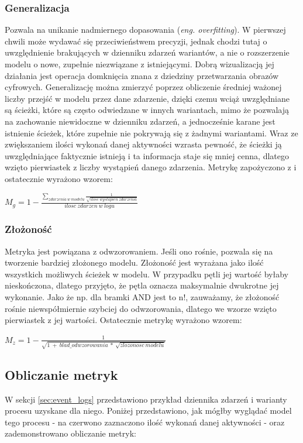 \subsubsection{Generalizacja}
Pozwala na unikanie nadmiernego dopasowania (\textit{eng. overfitting}). W pierwszej chwili może wydawać się przeciwieństwem precyzji, jednak chodzi tutaj o uwzględnienie brakujących w dzienniku zdarzeń wariantów, a nie o rozszerzenie modelu o nowe, zupełnie niezwiązane z istniejącymi. Dobrą wizualizacją jej działania jest operacja domknięcia znana z dziedziny przetwarzania obrazów cyfrowych. Generalizację można zmierzyć poprzez obliczenie średniej ważonej liczby przejść w modelu przez dane zdarzenie, dzięki czemu wciąż uwzględniane są ścieżki, które są często odwiedzane w innych wariantach, mimo że pozwalają na zachowanie niewidoczne w dzienniku zdarzeń, a jednocześnie karane jest istnienie ścieżek, które zupełnie nie pokrywają się z żadnymi wariantami. Wraz ze zwiększaniem ilości wykonań danej aktywności wzrasta pewność, że ścieżki ją uwzględniające faktycznie istnieją i ta informacja staje się mniej cenna, dlatego wzięto pierwiastek z liczby wystąpień danego zdarzenia. Metrykę zapożyczono z \cite{qd-in-discovery} i ostatecznie wyrażono wzorem:
\begin{center}
$M_g = 1 - \frac{\sum_{zdarzenia\ w\ modelu} \frac{1}{\sqrt{ilosc\ wystapien\ zdarzenia}}}{ilosc\ zdarzen\ w\ logu} $
\end{center}
\subsubsection{Złożoność}
Metryka jest powiązana z odwzorowaniem. Jeśli ono rośnie, pozwala się na tworzenie bardziej złożonego modelu. Złożoność jest wyrażana jako ilość wszystkich możliwych ścieżek w modelu. W przypadku pętli jej wartość byłaby nieskończona, dlatego przyjęto, że pętla oznacza maksymalnie dwukrotne jej wykonanie. Jako że np. dla bramki AND jest to n!, zauważamy, że złożoność rośnie niewspółmiernie szybciej do odwzorowania, dlatego we wzorze wzięto pierwiastek z jej wartości. Ostatecznie metrykę wyrażono wzorem: 
\begin{center}
$M_z = 1 - \frac{1}{\sqrt{1\ +\ blad\_odwzorowania\ *\ \sqrt{zlozonosc\ modelu}}} $
\end{center}
\subsection{Obliczanie metryk}
W sekcji \ref{sec:event_logs} przedstawiono przykład dziennika zdarzeń i warianty procesu uzyskane dla niego. Poniżej przedstawiono, jak mógłby wyglądać model tego procesu - na czerwono zaznaczono ilość wykonań danej aktywności - oraz zademonstrowano obliczanie metryk:

